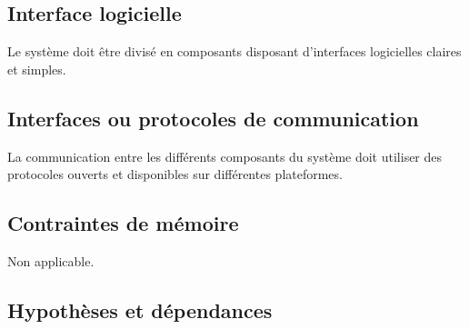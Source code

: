 	\subsection{Interface logicielle}

\begin{requirement}
	Le système doit être divisé en composants disposant d’interfaces logicielles claires et simples.
\end{requirement}

	\subsection{Interfaces ou protocoles de communication}
	
\begin{requirement}
	La communication entre les différents composants du système doit utiliser des protocoles ouverts et disponibles sur différentes plateformes.
\end{requirement}

	\subsection{Contraintes de mémoire}
Non applicable.

\subsection{Hypothèses et dépendances}

